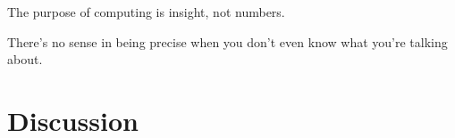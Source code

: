 \begin{savequote}[0.55\linewidth]
	\begin{fancyquote}
		The purpose of computing is insight, not numbers.
	\end{fancyquote}
	\begin{fancyquote}
		There's no sense in being precise when you don't even know what
		you're talking about.
	\end{fancyquote}
\end{savequote}
\chapter{Discussion}\label{ch:discussion}

